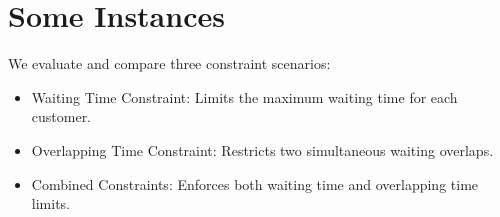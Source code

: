 \documentclass{article}
\newcommand{\Z}{\mathbf{Z}}
\newcommand{\D}{\bm{\Delta}}
\begin{document}










\section{Some Instances}
We evaluate and compare three constraint scenarios: 

\begin{itemize}
    \item  Waiting Time Constraint: Limits the maximum waiting time for each customer.
    \item  Overlapping Time Constraint: Restricts two simultaneous waiting overlaps.
    \item  Combined Constraints: Enforces both waiting time and overlapping time limits.
\end{itemize}
\end{document}

